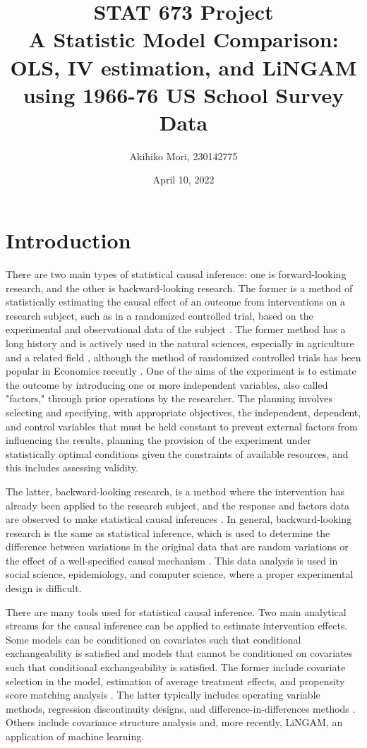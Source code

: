 \documentclass{article}\usepackage[]{graphicx}\usepackage[]{xcolor}
\title{STAT 673 Project\\
\Large A Statistic Model Comparison: OLS, IV estimation, and LiNGAM\\using 1966-76 US School Survey Data}
\author{Akihiko Mori, 230142775}%
\date{April 10, 2022}            %
\begin{document}
\maketitle
\onehalfspacing



\section{Introduction}
There are two main types of statistical causal inference: one is forward-looking research, and the other is backward-looking research.
The former is a method of statistically estimating the causal effect of an outcome from interventions on a research subject, 
such as in a randomized controlled trial, based on the experimental and observational data of the subject \citep{chalmers1981method}.
The former method has a long history and is actively used in the natural sciences, especially in agriculture and a related field \citep{mann1949analysis}, although the method of randomized controlled trials has been popular in Economics recently \citep{banerjee2016influence}.
One of the aims of the experiment is to estimate the outcome by introducing one or more independent variables, also called "factors," through prior operations by the researcher.
The planning involves selecting and specifying, with appropriate objectives, the independent, dependent, and control variables that must be held constant to prevent external factors from influencing the results, planning the provision of the experiment under statistically optimal conditions given the constraints of available resources, and this includes assessing validity.

The latter, backward-looking research, is a method where the intervention has already been applied to the research subject, and the response and factors data are observed to make statistical causal inferences \citep{stock2003retrospectives}.
In general, backward-looking research is the same as statistical inference, which is used to determine the difference between variations in the original data that are random variations or the effect of a well-specified causal mechanism \citep{dinardo2010natural}.
This data analysis is used in social science, epidemiology, and computer science, where a proper experimental design is difficult.

There are many tools used for statistical causal inference. 
Two main analytical streams for the causal inference can be applied to estimate intervention effects.
Some models can be conditioned on covariates such that conditional exchangeability is satisfied and models that cannot be conditioned on covariates such that conditional exchangeability is satisfied.
The former include covariate selection in the model, estimation of average treatment effects, and propensity score matching analysis \citep{lousdal2018introduction}.
The latter typically includes operating variable methods, regression discontinuity designs, and difference-in-differences methods \citep{hernan2010causal}. Others include covariance structure analysis and, more recently, LiNGAM, an application of machine learning.
\end{document}
